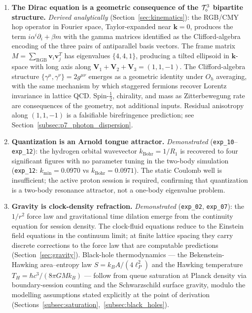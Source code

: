 \begin{enumerate}

\item \textbf{The Dirac equation is a geometric consequence of the
$\mathcal{T}_\diamond^3$ bipartite structure.}
\textit{Derived analytically} (Section~\ref{sec:kinematics}):
the RGB/CMY hop operator in Fourier space, Taylor-expanded near
$\mathbf{k}=0$, produces the term $i\alpha^i\partial_i + \beta m$
with the gamma matrices identified as the Clifford-algebra encoding
of the three pairs of antiparallel basis vectors.
The frame matrix $M = \sum_\text{RGB}\mathbf{v}_i\mathbf{v}_j^T$
has eigenvalues $\{4, 4, 1\}$, producing a tilted ellipsoid in
$\mathbf{k}$-space with long axis along
$\mathbf{V}_1+\mathbf{V}_2+\mathbf{V}_3 = (1,1,-1)$.  The
Clifford-algebra structure $\{\gamma^\mu,\gamma^\nu\}=2g^{\mu\nu}$
emerges as a geometric identity under $O_h$ averaging, with the
same mechanism by which staggered fermions recover Lorentz
invariance in lattice QCD.  Spin-$\frac{1}{2}$, chirality, and
mass as Zitterbewegung rate are consequences of the geometry, not
additional inputs.  Residual anisotropy along $(1,1,-1)$ is a
falsifiable birefringence prediction; see
Section~\ref{subsec:p7_photon_dispersion}.

\item \textbf{Quantization is an Arnold tongue attractor.}
\textit{Demonstrated} (\texttt{exp\_10}--\texttt{exp\_12}):
the hydrogen orbital wavevector $k_\text{Bohr} = 1/R_1$ is recovered
to four significant figures with no parameter tuning in the two-body
simulation (\texttt{exp\_12}: $k_\text{min} = 0.0970$ vs
$k_\text{Bohr} = 0.0971$).
The static Coulomb well is insufficient; the active proton session is
required, confirming that quantization is a two-body resonance
attractor, not a one-body eigenvalue problem.

\item \textbf{Gravity is clock-density refraction.}
\textit{Demonstrated} (\texttt{exp\_02}, \texttt{exp\_07}):
the $1/r^2$ force law and gravitational time dilation emerge from the
continuity equation for session density.
The clock-fluid equations reduce to the Einstein field equations in
the continuum limit; at finite lattice spacing they carry discrete
corrections to the force law that are computable predictions
(Section~\ref{sec:gravity}).
Black-hole thermodynamics --- the Bekenstein-Hawking area--entropy
law $S = k_B A/(4\ell_P^2)$ and the Hawking temperature
$T_H = \hbar c^3/(8\pi G M k_B)$ --- follow from queue saturation at
Planck density via boundary-session counting and the Schwarzschild
surface gravity, modulo the modelling assumptions stated explicitly
at the point of derivation
(Sections~\ref{subsec:saturation},~\ref{subsec:black_holes}).


\end{enumerate}
